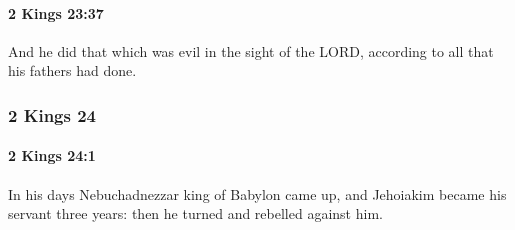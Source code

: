 		\paragraph{2 Kings 23:37} %
			\label{2KINGS-23-37}

			And he did that which was evil in the sight of the LORD, according to all that his fathers had done.

	\subsubsection{2 Kings 24} %
		\label{2KINGS-24}

		\paragraph{2 Kings 24:1} %
			\label{2KINGS-24-1}

			In his days Nebuchadnezzar king of Babylon came up, and Jehoiakim became his servant three years: then he turned and rebelled against him.

